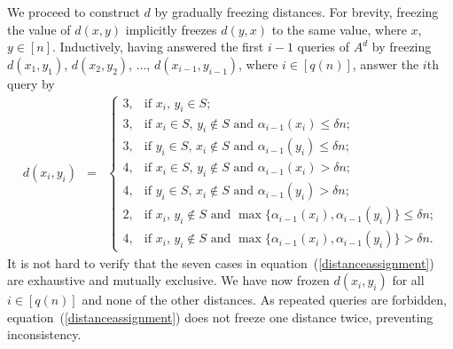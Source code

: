 \documentclass[letterpaper,12pt]{article}
\begin{document}
We proceed to
construct $d$ by gradually freezing distances.
For brevity, freezing
the value of
$d(x,y)$
implicitly freezes $d(y,x)$ to the same value, where $x$, $y\in[n]$.
Inductively, having
answered the first $i-1$ queries of $A^d$ by freezing
$d(x_1,y_1)$, $d(x_2,y_2)$, $\ldots$,
$d(x_{i-1},y_{i-1})$, where $i\in[q(n)]$,
answer the $i$th query by
\begin{eqnarray}
d\left(x_i,y_i\right)
&=&\left\{
\begin{array}{ll}
3, &\text{if $x_i$, $y_i\in S$;}\\
3, &\text{if $x_i\in S$, $y_i\notin S$ and $\alpha_{i-1}(x_i)\le\delta n$;}\\
3, &\text{if $y_i\in S$, $x_i\notin S$ and $\alpha_{i-1}(y_i)\le\delta n$;}\\
4, &\text{if $x_i\in S$, $y_i\notin S$ and $\alpha_{i-1}(x_i)>\delta n$;}\\
4, &\text{if $y_i\in S$, $x_i\notin S$ and $\alpha_{i-1}(y_i)>\delta n$;}\\
2, &\text{if $x_i$, $y_i\notin S$ and $\max\{\alpha_{i-1}(x_i),\alpha_{i-1}(y_i)\}\le\delta n$;}\\
4, &\text{if $x_i$, $y_i\notin S$ and $\max\{\alpha_{i-1}(x_i),\alpha_{i-1}(y_i)\}>\delta n$.}
\end{array}
\right.
\label{distanceassignment}
\end{eqnarray}
It is not hard to verify that
the seven cases
in equation~(\ref{distanceassignment})
are
exhaustive and
mutually
exclusive.
We have now
frozen
$d(x_i,y_i)$ for all $i\in[q(n)]$ and none of the other distances.
As repeated queries are forbidden, equation~(\ref{distanceassignment})
does not freeze one distance twice,
preventing inconsistency.
\end{document}
